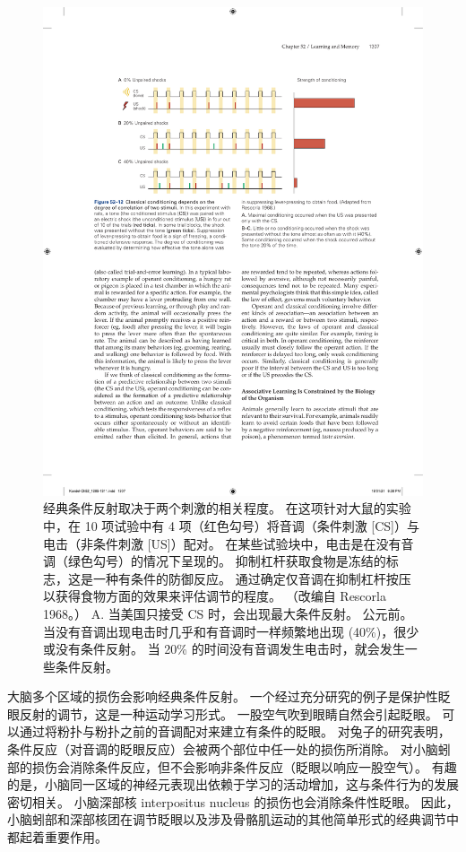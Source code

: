 \begin{figure}[htbp]
	\centering
	\includegraphics[width=0.8\linewidth]{chap52/fig_52_12}
	\caption{经典条件反射取决于两个刺激的相关程度。 在这项针对大鼠的实验中，在 10 项试验中有 4 项（红色勾号）将音调（条件刺激 [CS]）与电击（非条件刺激 [US]）配对。 在某些试验块中，电击是在没有音调（绿色勾号）的情况下呈现的。 抑制杠杆获取食物是冻结的标志，这是一种有条件的防御反应。 通过确定仅音调在抑制杠杆按压以获得食物方面的效果来评估调节的程度。 （改编自 Rescorla 1968。） A. 当美国只接受 CS 时，会出现最大条件反射。 公元前。 当没有音调出现电击时几乎和有音调时一样频繁地出现 (40\%)，很少或没有条件反射。 当 20\% 的时间没有音调发生电击时，就会发生一些条件反射。}
	\label{fig:52_12}
\end{figure}


大脑多个区域的损伤会影响经典条件反射。
一个经过充分研究的例子是保护性眨眼反射的调节，这是一种运动学习形式。
一股空气吹到眼睛自然会引起眨眼。
可以通过将粉扑与粉扑之前的音调配对来建立有条件的眨眼。
对兔子的研究表明，条件反应（对音调的眨眼反应）会被两个部位中任一处的损伤所消除。
对小脑蚓部的损伤会消除条件反应，但不会影响非条件反应（眨眼以响应一股空气）。
有趣的是，小脑同一区域的神经元表现出依赖于学习的活动增加，这与条件行为的发展密切相关。
小脑深部核 interpositus nucleus 的损伤也会消除条件性眨眼。
因此，小脑蚓部和深部核团在调节眨眼以及涉及骨骼肌运动的其他简单形式的经典调节中都起着重要作用。


